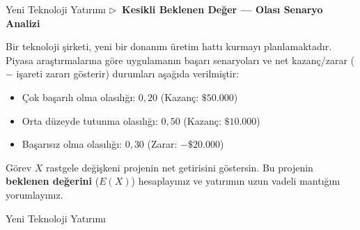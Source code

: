 \documentclass[light]{lutbeamer}
\begin{document}
\begin{frame}{Yeni Teknoloji Yatırımı}
  \textbf{\small $\triangleright$~Kesikli Beklenen Değer --- Olası Senaryo Analizi}

  \smallskip
  \small
  Bir teknoloji şirketi, yeni bir donanım üretim hattı kurmayı planlamaktadır. Piyasa araştırmalarına göre uygulamanın başarı senaryoları ve net kazanç/zarar ($-$ işareti zararı gösterir) durumları aşağıda verilmiştir:
  \begin{itemize}
    \item Çok başarılı olma olasılığı: $0{,}20$ (Kazanç: $\$50.000$)
    \item Orta düzeyde tutunma olasılığı: $0{,}50$ (Kazanç: $\$10.000$)
    \item Başarısız olma olasılığı: $0{,}30$ (Zarar: $-\$20.000$)
  \end{itemize}

  \medskip
  \begin{block}{Görev}
    $X$ rastgele değişkeni projenin net getirisini göstersin. Bu projenin \textbf{beklenen değerini} ($E(X)$) hesaplayınız ve yatırımın uzun vadeli mantığını yorumlayınız.
  \end{block}
\end{frame}

\begin{frame}{Yeni Teknoloji Yatırımı}
\end{frame}
\end{document}
